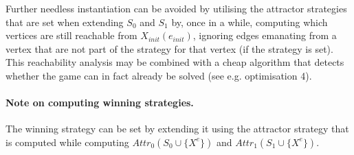 \documentclass{article}
\newcommand{\If}{\text{\textbf{if }}}
\newcommand{\Then}{\text{\textbf{ then }}}
\begin{document}
Further needless instantiation can be avoided by utilising the attractor
strategies that are set when extending $S_0$ and $S_1$ by, once in a while, computing
which vertices are still reachable from $X_\textit{init}(e_\textit{init})$, ignoring
edges emanating from a vertex that are not part of the strategy for that vertex (if the
strategy is set). This reachability analysis may be combined with a cheap algorithm that
detects whether the game can in fact already be solved (see e.g. optimisation 4). 




\paragraph{Note on computing winning strategies.} The winning strategy can be set by extending
it using the attractor strategy that is computed while
computing $Attr_0(S_0 \cup \{X^e\})$ and $Attr_1(S_1 \cup \{X^e\})$.
\end{document}
